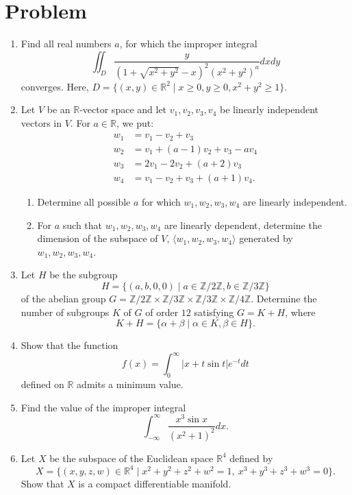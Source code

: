 \documentclass[10pt,a4paper]{article}
\begin{document}
\section*{Problem}
\begin{enumerate}[label=\fbox{\arabic*}]
  \item %
        Find all real numbers $a$, for which the improper integral
        \[
          \iint_D \frac{y}{(1 + \sqrt{x^2+y^2} - x)^2(x^2+y^2)^a} dxdy
        \]
        converges. Here, $D = \{(x, y) \in \mathbb{R}^2 \mid x \ge 0, y \ge 0, x^2+y^2 \ge 1\}$.

  \item %
        Let $V$ be an $\mathbb{R}$-vector space and let $v_1, v_2, v_3, v_4$ be linearly independent vectors in $V$. For $a \in \mathbb{R}$, we put:
        \begin{align*}
          w_1 &= v_1 - v_2 + v_3 \\
          w_2 &= v_1 + (a - 1)v_2 + v_3 - a v_4 \\
          w_3 &= 2v_1 - 2v_2 + (a + 2)v_3 \\
          w_4 &= v_1 - v_2 + v_3 + (a + 1)v_4.
        \end{align*}
        \begin{enumerate}[label=(\arabic*)]
          \item Determine all possible $a$ for which $w_1, w_2, w_3, w_4$ are linearly independent.
          \item For $a$ such that $w_1, w_2, w_3, w_4$ are linearly dependent, determine the dimension of the subspace of $V$, $\langle w_1, w_2, w_3, w_4 \rangle$ generated by $w_1, w_2, w_3, w_4$.
        \end{enumerate}

  \item %
        Let $H$ be the subgroup
        \[
          H = \{(a, b, 0, 0) \mid a \in \mathbb{Z}/2\mathbb{Z}, b \in \mathbb{Z}/3\mathbb{Z}\}
        \]
        of the abelian group $G = \mathbb{Z}/2\mathbb{Z} \times \mathbb{Z}/3\mathbb{Z} \times \mathbb{Z}/3\mathbb{Z} \times \mathbb{Z}/4\mathbb{Z}$. Determine the number of subgroups $K$ of $G$ of order $12$ satisfying $G = K + H$, where
        \[
          K + H = \{ \alpha + \beta \mid \alpha \in K, \beta \in H \}.
        \]

  \item %
        Show that the function
        \[
          f(x) = \int_0^\infty |x + t \sin t| e^{-t} dt
        \]
        defined on $\mathbb{R}$ admits a minimum value.

  \item %
        Find the value of the improper integral
        \[
          \int_{-\infty}^\infty \frac{x^3 \sin x}{(x^2 + 1)^2} dx.
        \]

  \item %
        Let $X$ be the subspace of the Euclidean space $\mathbb{R}^4$ defined by
        \[
          X = \{ (x, y, z, w) \in \mathbb{R}^4 \mid x^2 + y^2 + z^2 + w^2 = 1, \ x^3 + y^3 + z^3 + w^3 = 0 \}.
        \]
        Show that $X$ is a compact differentiable manifold.
\end{enumerate}
\end{document}
